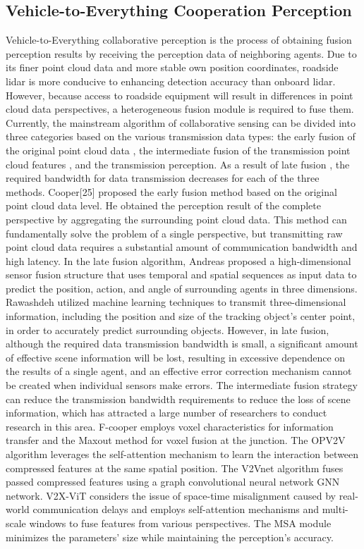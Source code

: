 \documentclass[lettersize,journal]{IEEEtran}
\begin{document}
\subsection{ Vehicle-to-Everything Cooperation Perception}
Vehicle-to-Everything collaborative perception is the process of obtaining fusion perception results by receiving the perception data of neighboring agents. Due to its finer point cloud data and more stable own position coordinates, roadside lidar is more conducive to enhancing detection accuracy than onboard lidar. However, because access to roadside equipment will result in differences in point cloud data perspectives, a heterogeneous fusion module is required to fuse them.
Currently, the mainstream algorithm of collaborative sensing can be divided into three categories based on the various transmission data types: the early fusion of the original point cloud data \cite{25}, the intermediate fusion of the transmission point cloud features \cite{8}\cite{26}\cite{27}\cite{28}, and the transmission perception. As a result of late fusion \cite{29}\cite{30}\cite{39}, the required bandwidth for data transmission decreases for each of the three methods. Cooper[25] proposed the early fusion method based on the original point cloud data level. He obtained the perception result of the complete perspective by aggregating the surrounding point cloud data. This method can fundamentally solve the problem of a single perspective, but transmitting raw point cloud data requires a substantial amount of communication bandwidth and high latency. In the late fusion algorithm, Andreas\cite{29} proposed a high-dimensional sensor fusion structure that uses temporal and spatial sequences as input data to predict the position, action, and angle of surrounding agents in three dimensions. Rawashdeh \cite{30} utilized machine learning techniques to transmit three-dimensional information, including the position and size of the tracking object's center point, in order to accurately predict surrounding objects. However, in late fusion, although the required data transmission bandwidth is small, a significant amount of effective scene information will be lost, resulting in excessive dependence on the results of a single agent, and an effective error correction mechanism cannot be created when individual sensors make errors. 
The intermediate fusion strategy can reduce the transmission bandwidth requirements to reduce the loss of scene information, which has attracted a large number of researchers to conduct research in this area. F-cooper \cite{26} employs voxel characteristics for information transfer and the Maxout \cite{31} method for voxel fusion at the junction. The OPV2V \cite{28} algorithm leverages the self-attention mechanism \cite{32} to learn the interaction between compressed features at the same spatial position. The V2Vnet \cite{27} algorithm fuses passed compressed features using a graph convolutional neural network GNN \cite{33} network. V2X-ViT \cite{8} considers the issue of space-time misalignment caused by real-world communication delays and employs self-attention mechanisms and multi-scale windows to fuse features from various perspectives. The MSA module minimizes the parameters' size while maintaining the perception's accuracy.
\end{document}
